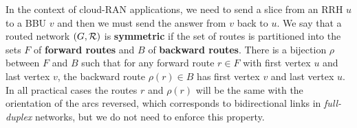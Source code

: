 \documentclass[10pt]{article}
\newtheorem{lemma}[theorem]{Lemma}
\newcommand\pra{\textsc{pra}\xspace}
\begin{document}
%
%      
%
%
      
      
   In the context of cloud-RAN applications, we need to send a slice from an RRH $u$ to a BBU $v$ and then 
      we must send the answer from $v$ back to $u$. We say that a routed network $(G, {\cal R})$ is \textbf{symmetric} if the set of routes is partitioned into the sets $F$ of \textbf{forward routes} and $B$ of \textbf{backward routes}. There is a bijection $\rho$ between $F$ and $B$ such that for any forward route $r \in F$ with first vertex $u$ and last vertex $v$, the backward route $\rho(r) \in B$ has first vertex $v$ and last vertex $u$. In all practical cases the routes $r$ and $\rho(r)$ will be the same with the orientation of the arcs reversed, which corresponds to bidirectional links in \emph{full-duplex} networks, but we do not need to enforce this property.
         
\end{document}
